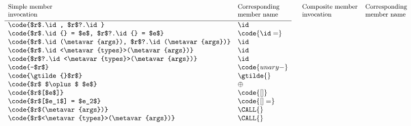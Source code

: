 \documentclass[makeidx]{article}
\begin{document}
{\begin{figure}[h]
  \begin{minipage}[t]{\textwidth}
    \begin{displaymath}
      \hspace{-2mm}\begin{array}[t]{lll}
        \parbox{.22\textwidth}{\small Simple member\\invocation}
        & \parbox{.17\textwidth}{\small Corresponding member name} \\[3mm]
        \hline
        \code{$r$.\id, $r$?.\id}                         & \id \\
        \code{$r$.\id{} = $e$,
          $r$?.\id{} = $e$}                              & \code{\id=} \\
        \code{$r$.\id(\metavar{args}),
          $r$?.\id(\metavar{args})}                      & \id \\
        \code{$r$.\id<\metavar{types}>(\metavar{args})}  & \id \\
        \code{$r$?.\id<\metavar{types}>(\metavar{args})} & \id \\
        \code{-$r$}                                      & \code{unary-} \\
        \code{\gtilde{}$r$}                              & \gtilde{} \\
        \code{$r$ $\oplus$ $e$}                          & \oplus \\
        \code{$r$[$e$]}                                  & \code{[]} \\
        \code{$r$[$e_1$] = $e_2$}                        & \code{[]=} \\
        \code{$r$(\metavar{args})}                       & \CALL{} \\
        \code{$r$<\metavar{types}>(\metavar{args})}      & \CALL{} \\
      \end{array}
      \quad
      \begin{array}[t]{ll}
        \parbox{.23\textwidth}{\small Composite member\\invocation}
        & \parbox{.18\textwidth}{\small Corresponding member name} \\[3mm]

\end{array}
\end{displaymath}
\end{minipage}
\end{figure}}
\end{document}
